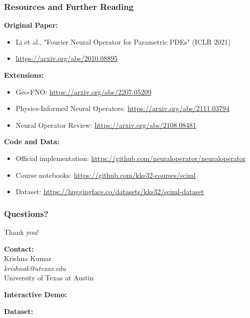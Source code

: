 \documentclass{beamer}
\begin{document}
\begin{frame}
\frametitle{Resources and Further Reading}

\textbf{Original Paper:}
\begin{itemize}
    \item Li et al., "Fourier Neural Operator for Parametric PDEs" (ICLR 2021)
    \item \url{https://arxiv.org/abs/2010.08895}
\end{itemize}

\vspace{0.2cm}

\textbf{Extensions:}
\begin{itemize}
    \item Geo-FNO: \url{https://arxiv.org/abs/2207.05209}
    \item Physics-Informed Neural Operators: \url{https://arxiv.org/abs/2111.03794}
    \item Neural Operator Review: \url{https://arxiv.org/abs/2108.08481}
\end{itemize}

\vspace{0.2cm}

\textbf{Code and Data:}
\begin{itemize}
    \item Official implementation: \url{https://github.com/neuraloperator/neuraloperator}
    \item Course notebooks: \url{https://github.com/kks32-courses/sciml}
    \item Dataset: \url{https://huggingface.co/datasets/kks32/sciml-dataset}
\end{itemize}

\end{frame}


\begin{frame}
\frametitle{Questions?}

\centering
\Large Thank you!

\vspace{0.4cm}

\textbf{Contact:} \\
Krishna Kumar \\
\textit{krishnak@utexas.edu} \\
University of Texas at Austin

\vspace{0.3cm}

\textbf{Interactive Demo:} \\
\href{https://colab.research.google.com/github/kks32-courses/sciml/blob/main/docs/05-fno/fno.ipynb}{}

\vspace{0.2cm}

\textbf{Dataset:} \\
\href{https://huggingface.co/datasets/kks32/sciml-dataset}{}

\end{frame}
\end{document}
